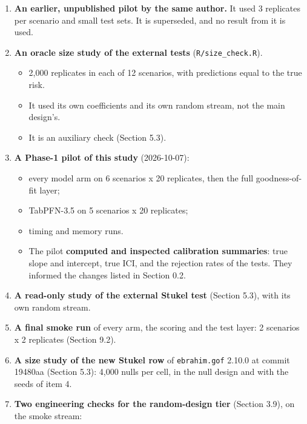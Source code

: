 \documentclass[
  10pt,
]{article}
\providecommand{\tightlist}{%
  \setlength{\itemsep}{0pt}\setlength{\parskip}{0pt}}
\begin{document}
\begin{enumerate}
\def\labelenumi{\arabic{enumi}.}
\tightlist
\item
  \textbf{An earlier, unpublished pilot by the same author.}
  It used 3 replicates per scenario and small test sets. It
  is superseded, and no result from it is used.
\item
  \textbf{An oracle size study of the external tests}
  (\texttt{R/size\_check.R}).

  \begin{itemize}
  \tightlist
  \item
    2,000 replicates in each of 12 scenarios, with
    predictions equal to the true risk.
  \item
    It used its own coefficients and its own random stream,
    not the main design's.
  \item
    It is an auxiliary check (Section 5.3).
  \end{itemize}
\item
  \textbf{A Phase-1 pilot of this study} (2026-10-07):

  \begin{itemize}
  \tightlist
  \item
    every model arm on 6 scenarios x 20 replicates, then the
    full goodness-of-fit layer;
  \item
    TabPFN-3.5 on 5 scenarios x 20 replicates;
  \item
    timing and memory runs.
  \item
    The pilot \textbf{computed and inspected calibration
    summaries}: true slope and intercept, true ICI, and the
    rejection rates of the tests. They informed the changes
    listed in Section 0.2.
  \end{itemize}
\item
  \textbf{A read-only study of the external Stukel test}
  (Section 5.3), with its own random stream.
\item
  \textbf{A final smoke run} of every arm, the scoring and
  the test layer: 2 scenarios x 2 replicates (Section 9.2).
\item
  \textbf{A size study of the new Stukel row} of
  \texttt{ebrahim.gof} 2.10.0 at commit 19480aa (Section
  5.3): 4,000 nulls per cell, in the null design and with
  the seeds of item 4.
\item
  \textbf{Two engineering checks for the random-design tier}
  (Section 3.9), on the smoke stream:


\end{enumerate}
\end{document}
